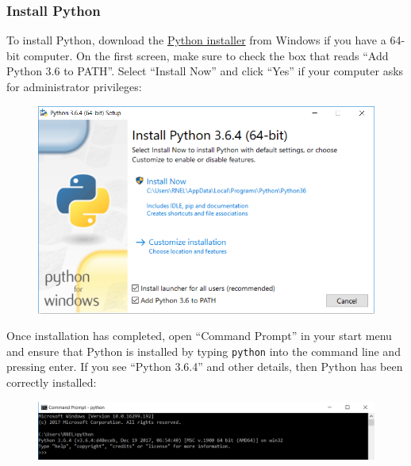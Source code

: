 \documentclass[10pt,oneside,a4paper]{article}
\begin{document}
\subsubsection{Install Python}
To install Python, download the \href{https://www.python.org/ftp/python/3.6.4/python-3.6.4-amd64.exe}{\color{blue}Python installer} from Windows if you have a 64-bit computer. On the first screen, make sure to check the box that reads ``Add Python 3.6 to PATH''. Select ``Install Now'' and click ``Yes'' if your computer asks for administrator privileges: 
\begin{figure}[H]
\includegraphics[width=\textwidth]{image.png}
\end{figure}
Once installation has completed, open ``Command Prompt'' in your start menu and ensure that Python is installed by typing \texttt{python} into the command line and pressing enter. If you see ``Python 3.6.4'' and other details, then Python has been correctly installed:
\begin{figure}[H]
\includegraphics[width=\textwidth]{commandline.png}
\end{figure}
\end{document}
